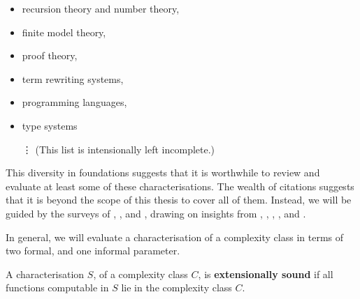 \begin{itemize}

\item recursion theory and number theory\cite{ritchie-1963, cobham-1965,
clote-1990, bellantoni-cook-1992, leivant-1995, ishihara-1999,
kristiansen-2005, marion-2009},

\item finite model theory\cite{fagin-1974, vardi-1982, immerman-1982,
immerman-1986, immerman-1987},

\item proof theory\cite{girard-scedorov-scott-1992, leivant-1994, girard-1998,
asperti-roversi-2002, lafont-2004, dal-lago-hofmann-2010},


\item term rewriting
systems\cite{beckmann-weiermann-1996, bonfante-et-al-1999, avanzini-et-al-2012,
de-carvalho-simonsen-2014},

\item programming languages\cite{voda-1994, jones-1999,
kristiansen-niggl-2004, kristiansen-voda-2005, niggl-wunderlich-2006},

\item type systems\cite{hofmann-2000b, crary-weirich-2000,
bellantoni-et-al-2000, hofmann-2003}

\hspace{-0.125in}\vdots\hspace{0.06in} (This list is intensionally left incomplete.)

\end{itemize}

This diversity in foundations suggests that it is worthwhile to review and
evaluate  at least some of these characterisations. The wealth of citations
suggests that it is beyond the scope of this thesis to cover all of them.
Instead, we will be guided by the surveys of \cite{clote-1999},
\cite{hofmann-2000a}, and \cite{dal-lago-2012}, drawing on insights from
\cite{jones-1999}, \cite{jones-2001}, \cite{niggl-2005},
\cite{niggl-wunderlich-2006}, and \cite{jones-kristiansen-2009}.

In general, we will evaluate a characterisation of a complexity class in terms
of two formal, and one informal parameter.
 
\begin{definition} \label{def:icc-soundness} A characterisation $S$, of a
complexity class $C$, is \textbf{extensionally sound} if all functions
computable in $S$ lie in the complexity class $C$.\end{definition} 

